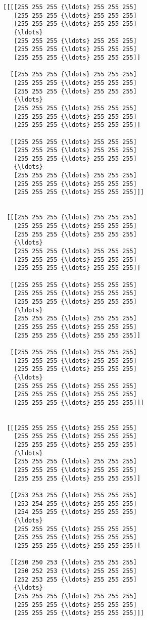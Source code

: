 \documentclass[11pt]{article}
\begin{document}
    \begin{Verbatim}[commandchars=\\\{\}]
[[[[255 255 255 {\ldots} 255 255 255]
   [255 255 255 {\ldots} 255 255 255]
   [255 255 255 {\ldots} 255 255 255]
   {\ldots}
   [255 255 255 {\ldots} 255 255 255]
   [255 255 255 {\ldots} 255 255 255]
   [255 255 255 {\ldots} 255 255 255]]

  [[255 255 255 {\ldots} 255 255 255]
   [255 255 255 {\ldots} 255 255 255]
   [255 255 255 {\ldots} 255 255 255]
   {\ldots}
   [255 255 255 {\ldots} 255 255 255]
   [255 255 255 {\ldots} 255 255 255]
   [255 255 255 {\ldots} 255 255 255]]

  [[255 255 255 {\ldots} 255 255 255]
   [255 255 255 {\ldots} 255 255 255]
   [255 255 255 {\ldots} 255 255 255]
   {\ldots}
   [255 255 255 {\ldots} 255 255 255]
   [255 255 255 {\ldots} 255 255 255]
   [255 255 255 {\ldots} 255 255 255]]]


 [[[255 255 255 {\ldots} 255 255 255]
   [255 255 255 {\ldots} 255 255 255]
   [255 255 255 {\ldots} 255 255 255]
   {\ldots}
   [255 255 255 {\ldots} 255 255 255]
   [255 255 255 {\ldots} 255 255 255]
   [255 255 255 {\ldots} 255 255 255]]

  [[255 255 255 {\ldots} 255 255 255]
   [255 255 255 {\ldots} 255 255 255]
   [255 255 255 {\ldots} 255 255 255]
   {\ldots}
   [255 255 255 {\ldots} 255 255 255]
   [255 255 255 {\ldots} 255 255 255]
   [255 255 255 {\ldots} 255 255 255]]

  [[255 255 255 {\ldots} 255 255 255]
   [255 255 255 {\ldots} 255 255 255]
   [255 255 255 {\ldots} 255 255 255]
   {\ldots}
   [255 255 255 {\ldots} 255 255 255]
   [255 255 255 {\ldots} 255 255 255]
   [255 255 255 {\ldots} 255 255 255]]]


 [[[255 255 255 {\ldots} 255 255 255]
   [255 255 255 {\ldots} 255 255 255]
   [255 255 255 {\ldots} 255 255 255]
   {\ldots}
   [255 255 255 {\ldots} 255 255 255]
   [255 255 255 {\ldots} 255 255 255]
   [255 255 255 {\ldots} 255 255 255]]

  [[253 253 255 {\ldots} 255 255 255]
   [253 254 255 {\ldots} 255 255 255]
   [254 255 255 {\ldots} 255 255 255]
   {\ldots}
   [255 255 255 {\ldots} 255 255 255]
   [255 255 255 {\ldots} 255 255 255]
   [255 255 255 {\ldots} 255 255 255]]

  [[250 250 253 {\ldots} 255 255 255]
   [250 252 253 {\ldots} 255 255 255]
   [252 253 255 {\ldots} 255 255 255]
   {\ldots}
   [255 255 255 {\ldots} 255 255 255]
   [255 255 255 {\ldots} 255 255 255]
   [255 255 255 {\ldots} 255 255 255]]]



\end{Verbatim}
\end{document}
